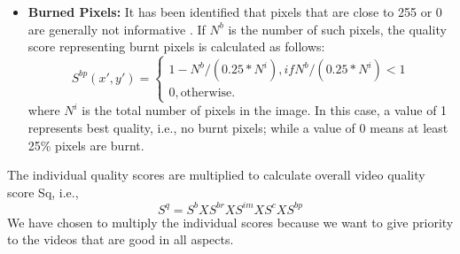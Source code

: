 \documentclass{sig-alternate}
\begin{document}
\begin{itemize}
\item \textbf{Burned Pixels:} It has been identiﬁed that pixels that are close to 255 or 0 are generally not informative \cite{wyszecki1982color}. If \(N^b\) is the number of such pixels, the quality score representing burnt pixels is calculated as follows: 
\begin{equation}
S^{bp}(x',y')=
\begin{cases}
1 - N^b/(0.25*N^i),if N^b/(0.25*N^i) < 1 \\
0, \text{otherwise}. 
\end{cases}
\end{equation}
where \(N^i\) is the total number of pixels in the image. In this case, a value of 1 represents best quality, i.e., no burnt pixels; while a value of 0 means at least 25\% pixels are burnt.
\end{itemize} 
The individual quality scores are multiplied to calculate overall video quality score Sq, i.e.,
\begin{equation}
S^q = S^b X S^{br} X S^{im} X S^c X S^{bp} 
\end{equation}
We have chosen to multiply the individual scores because we want to give priority to the videos that are good in all aspects. 
\end{document}
